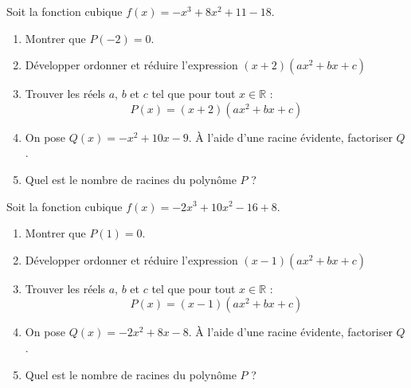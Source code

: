 \documentclass[main.tex]{subfiles}
\begin{document}
\begin{exercise} Soit la fonction cubique $f(x)=-x^3+8x^2+11-18$. 
	\begin{enumerate}[label=\alph*), leftmargin=*]
		\item Montrer que $P(-2)=0$.
		\item Développer ordonner et réduire l'expression $(x+2)(ax^2+bx+c)$
		\item Trouver les réels $a$, $b$ et $c$ tel que pour tout
		 $x\in\mathbb{R}$ : 
		 \setlength{\abovedisplayskip}{3pt}
		 \setlength{\belowdisplayskip}{3pt}
		$$
		P(x)= (x+2)(ax^2+bx+c)
		$$ 
	\item On pose $Q(x)=-x^2+10x-9$. À l'aide d'une racine évidente, factoriser $Q$. 
	\item Quel est le nombre de racines du polynôme $P$ ?
\end{enumerate} 
\end{exercise}
\begin{exercise}[entraînement]  Soit la fonction cubique $f(x)=-2x^3+10x^2-16+8$. 
	\begin{enumerate}[label=\alph*), leftmargin=*]
		\item Montrer que $P(1)=0$.
		\item Développer ordonner et réduire l'expression $(x-1)(ax^2+bx+c)$
		\item Trouver les réels $a$, $b$ et $c$ tel que pour tout
		$x\in\mathbb{R}$ : 
		\setlength{\abovedisplayskip}{3pt}
		\setlength{\belowdisplayskip}{3pt}
		$$
		P(x)= (x-1)(ax^2+bx+c)
		$$ 
		\item On pose $Q(x)=-2x^2+8x-8$. À l'aide d'une racine évidente, factoriser $Q$. 
		\item Quel est le nombre de racines du polynôme $P$ ?
	\end{enumerate} 
\end{exercise}
\vfill 
\end{document}
